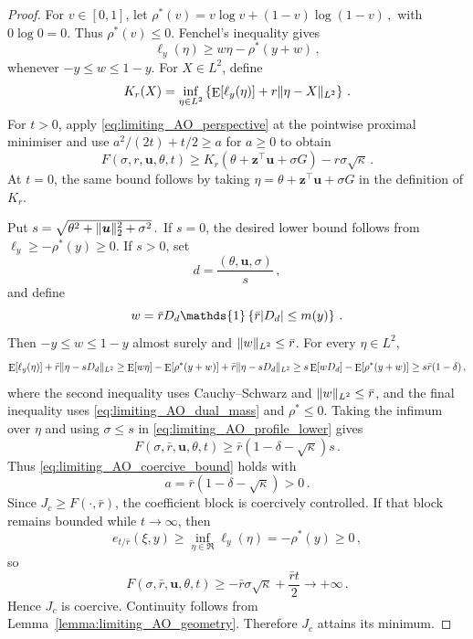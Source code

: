 \documentclass{article}
\makeatletter
\DeclareMathOperator{\expect}{E}
\theoremstyle{definition}
\newcommand{\vnorm}[1]{%
	\ensuremath{%
		\if@display
		\left\| #1 \right\|
		\else
		\| #1 \|
		\fi
	}%
}
\newcommand{\abs}[1]{%
	\ensuremath{%
		\if@display
		\left| #1 \right|
		\else
		\lvert #1 \rvert
		\fi
	}%
}
\newcommand*{\bb}{\boldsymbol}
\def\bu{\bb{u}}
\def\bz{\bb{z}}
\makeatother
\begin{document}
\begin{bibunit}
\begin{proof}
For $v\in[0,1]$, let $\rho^*(v) = v\log v+(1-v)\log(1-v)\,,$
with $0\log0=0$. Thus $\rho^*(v)\leq0$. Fenchel's inequality \citep[Chapter~4]{beck:2017} gives
\begin{equation}
\label{eq:limiting_AO_fenchel}
    \ell_y(\eta)
    \geq
    w\eta-\rho^*(y+w)\,,
\end{equation}
whenever $-y\leq w\leq1-y$.
For $X\in L^2$, define
$$
    K_r(X)
    =
    \underset{\eta\in L^2}{\inf}
    \left\{
        \expect[\ell_y(\eta)]
        +r\vnorm{\eta-X}_{L^2}
    \right\}\,.
$$
For $t>0$, apply \eqref{eq:limiting_AO_perspective} at the pointwise
proximal minimiser and use $a^2/(2t)+t/2\geq a$ for $a\geq0$ to obtain
\begin{equation}
\label{eq:limiting_AO_profile_lower}
    F(\sigma,r,\bu,\theta,t)
    \geq
    K_r(\theta+\bz^\top\bu+\sigma G)
    -r\sigma\sqrt\kappa\,.
\end{equation}
At $t=0$, the same bound follows by taking
$\eta=\theta+\bz^\top\bu+\sigma G$ in the definition of $K_r$.

Put $s=\sqrt{\theta^2+\vnorm{\bu}_2^2+\sigma^2}\,.$
If $s=0$, the desired lower bound follows from
$\ell_y\geq-\rho^*(y)\geq0$. If $s>0$, set
$$
    d=\frac{(\theta,\bu,\sigma)}s\,,
$$
and define
$$
    w
    =
    \bar rD_d\mathds{1}
    \left\{
        \bar r\abs{D_d}\leq m(y)
    \right\}\,.
$$
Then $-y\leq w\leq1-y$ almost surely and
$\vnorm{w}_{L^2}\leq\bar r$. For every $\eta\in L^2$,
$$
\begin{aligned}
    \expect[\ell_y(\eta)]
    +\bar r\vnorm{\eta-sD_d}_{L^2}\geq
    \expect[w\eta]
    -\expect[\rho^*(y+w)]
    +\bar r\vnorm{\eta-sD_d}_{L^2}
  \geq
    s\expect[wD_d]
    -\expect[\rho^*(y+w)]\geq
    s\bar r(1-\delta)\,,
\end{aligned}
$$
where the second inequality uses Cauchy--Schwarz \citep[Theorem~1.37(d)]{rudin+etal:1976} and
$\vnorm{w}_{L^2}\leq\bar r$, and the final inequality uses
\eqref{eq:limiting_AO_dual_mass} and $\rho^*\leq0$. Taking the infimum
over $\eta$ and using $\sigma\leq s$ in
\eqref{eq:limiting_AO_profile_lower} gives
$$
    F(\sigma,\bar r,\bu,\theta,t)
    \geq
    \bar r(1-\delta-\sqrt\kappa)s\,.
$$
Thus \eqref{eq:limiting_AO_coercive_bound} holds with
$$
    a
    =
    \bar r(1-\delta-\sqrt\kappa)>0\,.
$$
Since $J_c\geq F(\cdot,\bar r)$, the coefficient block is coercively
controlled. If that block remains bounded while $t\to\infty$, then
$$
    e_{t/\bar r}(\xi,y)
    \geq
    \underset{\eta\in\Re}{\inf}\ell_y(\eta)
    =
    -\rho^*(y)
    \geq0\,,
$$
so
$$
    F(\sigma,\bar r,\bu,\theta,t)
    \geq
    -\bar r\sigma\sqrt\kappa
    +\frac{\bar r t}{2}
    \to+\infty\,.
$$
Hence $J_c$ is coercive. Continuity follows from
Lemma~\ref{lemma:limiting_AO_geometry}. Therefore $J_c$ attains its
minimum.


\end{proof}
\end{bibunit}
\end{document}
